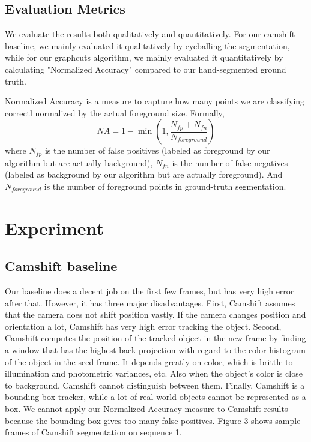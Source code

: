 \documentclass[10pt,twocolumn,letterpaper]{article}
\begin{document}
\subsection{Evaluation Metrics}
We evaluate the results both qualitatively and quantitatively. For our camshift baseline, we mainly evaluated it qualitatively by eyeballing the segmentation, while for our graphcuts algorithm, we mainly evaluated it quantitatively by calculating "Normalized Accuracy"\cite{AlexRGB} compared to our hand-segmented ground truth.

Normalized Accuracy is a measure to capture how many points we are classifying correctl normalized by the actual foreground size. Formally,
\begin{equation}
NA = 1-\min\left(1, \frac{N_{fp} + N_{fn}}{N_{foreground}}\right)
\end{equation}
where $N_{fp}$ is the number of false positives (labeled as foreground by our
algorithm but are actually background), $N_{fn}$ is the number of false
negatives (labeled as background by our algorithm but are actually foreground).
And $N_{foreground}$ is the number of foreground points in ground-truth
segmentation.

\section{Experiment}
\subsection{Camshift baseline}
Our baseline does a decent job on the first few frames, but has very high
error after that.
However, it has three major disadvantages. First, Camshift assumes that
the camera does not shift position vastly. If the camera changes position and 
orientation a lot, Camshift has very high error tracking the object.
Second, Camshift computes the position of the tracked object in the new frame
by finding a window that has the highest back projection with regard to the
color histogram of the object in the seed frame. It depends greatly on color,
which is brittle to illumination and photometric variances, etc. Also when the
object's color is close to background, Camshift cannot distinguish between
them.  
Finally, Camshift is a bounding box tracker, while a lot of real world objects
cannot be represented as a box. We cannot apply our Normalized Accuracy
measure to Camshift results because the bounding box gives too many
false positives.
Figure 3 shows sample frames of Camshift segmentation on sequence 1. 
\end{document}
